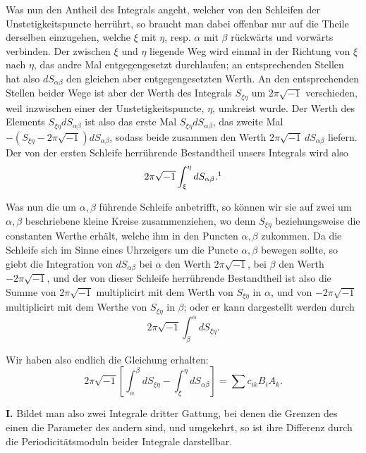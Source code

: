 \documentclass[10pt]{article}
\begin{document}
Was nun den Antheil des Integrals angeht, welcher von den Schleifen der Unstetigkeitspuncte herrührt, so braucht man dabei offenbar nur auf die Theile derselben einzugehen, welche \(\xi\) mit \(\eta\), resp. \(\alpha\) mit \(\beta\) rückwärts und vorwärts verbinden. Der zwischen \(\xi\) und \(\eta\) liegende Weg wird einmal in der Richtung von \(\xi\) nach \(\eta\), das andre Mal entgegengesetzt durchlaufen; an entsprechenden Stellen hat also \(dS_{\alpha\beta}\) den gleichen aber entgegengesetzten Werth. An den entsprechenden Stellen beider Wege ist aber der Werth des Integrals \(S_{\xi\eta}\) um \(2\pi\sqrt{-1}\) verschieden, weil inzwischen einer der Unstetigkeitspuncte, \(\eta\), umkreist wurde. Der Werth des Elements \(S_{\xi\eta}dS_{\alpha\beta}\) ist also das erste Mal \(S_{\xi\eta}dS_{\alpha\beta}\), das zweite Mal \(-(S_{\xi\eta}-2\pi\sqrt{-1})dS_{\alpha\beta}\), sodass beide zusammen den Werth \(2\pi\sqrt{-1}\,dS_{\alpha\beta}\) liefern. Der von der ersten Schleife herrührende Bestandtheil unsers Integrals wird also
\[
2\pi\sqrt{-1}\int_{\xi}^{\eta}dS_{\alpha\beta}.\footnotemark
\]

Was nun die um \(\alpha,\beta\) führende Schleife anbetrifft, so können wir sie auf zwei um \(\alpha,\beta\) beschriebene kleine Kreise zusammenziehen, wo denn \(S_{\xi\eta}\) beziehungsweise die constanten Werthe erhält, welche ihm in den Puncten \(\alpha,\beta\) zukommen. Da die Schleife sich im Sinne eines Uhrzeigers um die Puncte \(\alpha,\beta\) bewegen sollte, so giebt die Integration von \(dS_{\alpha\beta}\) bei \(\alpha\) den Werth \(2\pi\sqrt{-1}\), bei \(\beta\) den Werth \(-2\pi\sqrt{-1}\), und der von dieser Schleife herrührende Bestandtheil ist also die Summe von \(2\pi\sqrt{-1}\) multiplicirt mit dem Werth von \(S_{\xi\eta}\) in \(\alpha\), und von \(-2\pi\sqrt{-1}\) multiplicirt mit dem Werthe von \(S_{\xi\eta}\) in \(\beta\); oder er kann dargestellt werden durch
\[
2\pi\sqrt{-1}\int_{\beta}^{\alpha}dS_{\xi\eta}.
\]

Wir haben also endlich die Gleichung erhalten:
\[
\tag{1}
2\pi\sqrt{-1}\left[\int_{\alpha}^{\beta}dS_{\xi\eta}-\int_{\xi}^{\eta}dS_{\alpha\beta}\right]=\sum c_{ik}B_iA_k.
\]

\noindent\textbf{I.} Bildet man also zwei Integrale dritter Gattung, bei denen die Grenzen des einen die Parameter des andern sind, und umgekehrt, so ist ihre Differenz durch die Periodicitätsmoduln beider Integrale darstellbar.
\end{document}
